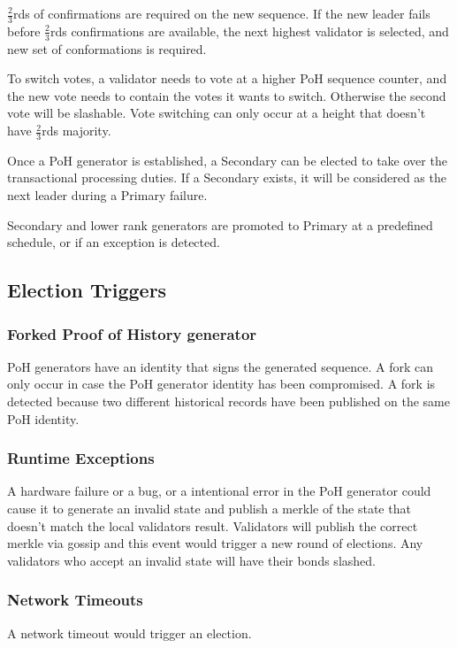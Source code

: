 \documentclass[12pt]{article}
\begin{document}
\(\frac{2}{3}\)rds of confirmations are required on the new sequence.  If the new leader fails before \(\frac{2}{3}\)rds confirmations are available, the next highest validator is selected, and new set of conformations is required.

To switch votes, a validator needs to vote at a higher PoH sequence counter, and the new vote needs to contain the votes it wants to switch.  Otherwise the second vote will be slashable. Vote switching can only occur at a height that doesn’t have \(\frac{2}{3}\)rds majority.

Once a PoH generator is established, a Secondary can be elected to take over the transactional processing duties.  If a Secondary exists, it will be considered as the next leader during a Primary failure.

Secondary and lower rank generators are promoted to Primary at a predefined schedule, or if an exception is detected.
\subsection{Election Triggers}
\subsubsection{Forked Proof of History generator}

PoH generators have an identity that signs the generated sequence.  A fork can only occur in case the PoH generator identity has been compromised.  A fork is detected because two different historical records have been published on the same PoH identity.

\subsubsection{Runtime Exceptions}
A hardware failure or a bug, or a intentional error in the PoH generator could cause it to generate an invalid state and publish a merkle of the state that doesn’t match the local validators result.  Validators will publish the correct merkle via gossip and this event would trigger a new round of elections.  Any validators who accept an invalid state will have their bonds slashed.

\subsubsection{Network Timeouts}

A network timeout would trigger an election.
\end{document}
